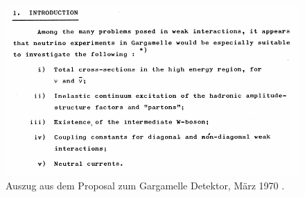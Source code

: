 \documentclass[aspectratio=1610, professionalfonts, 10pt]{beamer}
\begin{document}
\begin{frame}
	\begin{figure}
	  \centering
	  \includegraphics[width=0.9\linewidth]{Images/Screenshot_2018-11-26_16-27-27.png}
	  \caption{Auszug aus dem Proposal zum Gargamelle Detektor, März 1970 \cite{proposal}.}
	  \label{fig:proposal}
	\end{figure}
\end{frame}
\end{document}
